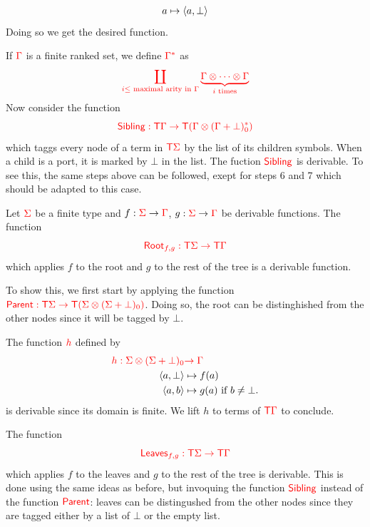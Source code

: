 \begin{example}
\begin{enumerate}
\begin{align*}
a \mapsto \langle{a,\bot}\rangle
\end{align*}
 Doing so we get the desired function.
\end{enumerate}
\medskip
If ${\color{red}{\Gamma}}$ is a finite ranked set, we define ${\color{red}{\Gamma^*}}$ as
$${\color{red}{\coprod_{i \leq \text{ maximal arity in } {\color{red}{\Gamma}}} \underbrace{{\color{red}{\Gamma}}\otimes \cdots \otimes {\color{red}{\Gamma}}}_{i\text{ times}}}}$$
Now consider the function $${\color{red}{\mathsf{Sibling}:{\color{red}{\mathsf T}}{\color{red}{\Gamma}}\to {\color{red}{\mathsf T}}({\color{red}{\Gamma}}\otimes ({\color{red}{\Gamma}}+\bot)^*_0)}}$$ which taggs every node of a term in ${\color{red}{\mathsf T}} {\color{red}{\Sigma}}$ by the list  of its children symbols. When a child is a port, it is marked by $\bot$ in the list.
The fuction ${\color{red}{\mathsf{Sibling}}}$ is derivable. To see this, the same steps above can be followed, exept for steps 6 and 7 which should be adapted to this case. 
\end{example}



\medskip
\noindent  \begin{example} Let ${\color{red}{\Sigma}}$ be a finite type and $f:{\color{red}{\Sigma}} \to {\color{red}{\Gamma}}$, $g: {\color{red}{\Sigma}} \to {\color{red}{\Gamma}}$ be derivable functions. The function $${\color{red}{\mathsf{Root}_{f,g} : {\color{red}{\mathsf T}}{\color{red}{\Sigma}}\to {\color{red}{\mathsf T}}{\color{red}{\Gamma}}}}$$
which applies $f$ to the root and $g$ to the rest of the tree is a derivable function.
 
To show this, we first start by applying the function ${\color{red}{\mathsf{Parent}:{\color{red}{\mathsf T}}{\color{red}{\Sigma}}\to{\color{red}{\mathsf T}}({\color{red}{\Sigma}}\otimes({\color{red}{\Sigma}}+\bot)_0)}}$. Doing so, the root can be distinghished from the other nodes since it will be tagged by $\bot$.  

The function ${\color{red}{h}}$ defined by 
\begin{align*}
{\color{red}{h:{\color{red}{\Sigma}}\otimes({\color{red}{\Sigma}}+\bot)_0}}&{\color{red}{\to {\color{red}{\Gamma}}}}\\
  \langle{a,\bot}\rangle &\mapsto f(a) \\
  \langle{a,b}\rangle &\mapsto g(a) \text{ if } b\neq \bot.
\end{align*}
is derivable since its domain is finite. 
We lift $h$ to terms of ${\color{red}{\mathsf T}}{\color{red}{\Gamma}}$ to conclude.



\medskip
The function $${\color{red}{\mathsf{Leaves}_{f,g} : {\color{red}{\mathsf T}}{\color{red}{\Sigma}}\to {\color{red}{\mathsf T}}{\color{red}{\Gamma}}}}$$
 which applies $f$ to the leaves and $g$ to the rest of the tree is derivable. This is done using the same ideas as before, but invoquing the function ${\color{red}{\mathsf{Sibling}}}$ instead of the function ${\color{red}{\mathsf{Parent}}}$: leaves can be distingushed from the other nodes since they are tagged either by a list of $\bot$ or the empty list.
\end{example}

